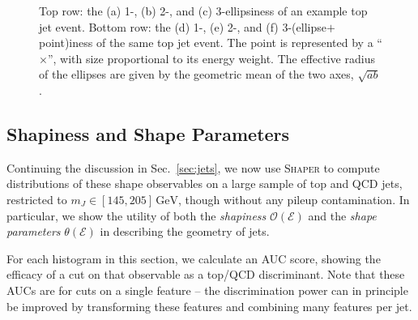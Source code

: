 \documentclass[letterpaper,11pt]{article}
\newcommand{\E}{\mathcal{E}}
\DeclareRobustCommand{\Sec}[1]{Sec.~\ref{sec:#1}}
\def\GeV{\text{GeV}}
\newcommand{\Shaper}{\textsc{Shaper}\xspace}
\begin{document}
\begin{figure*}[tp]
    \centering
    \vspace{1pt}
    \caption{
        Top row: the (a) 1-, (b) 2-, and (c) 3-ellipsiness of an example top jet event. Bottom row: the (d) 1-, (e) 2-, and (f) 3-(ellipse$+$point)iness of the same top jet event. The point is represented by a ``$\times$'', with size proportional to its energy weight. The effective radius of the ellipses are given by the geometric mean of the two axes, $\sqrt{ab}$.
        }
    \label{fig:n_ellipsiness}
\end{figure*}


\subsection{Shapiness and Shape Parameters}\label{sec:jets_parameters}


Continuing the discussion in \Sec{jets}, we now use \Shaper to compute distributions of these shape observables on a large sample of top and QCD jets, restricted to $m_J \in [145, 205]\,\GeV$, though without any pileup contamination. In particular, we show the utility of both the \emph{shapiness} $\mathcal{O}(\E)$ and the \emph{shape parameters} $\theta(\E)$ in describing the geometry of jets.

For each histogram in this section, we calculate an AUC score, showing the efficacy of a cut on that observable as a top/QCD discriminant. Note that these AUCs are for cuts on a single feature -- the discrimination power can in principle be improved by transforming these features and combining many features per jet.
\end{document}
